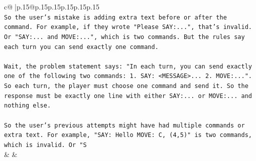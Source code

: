 \documentclass{article}
\begin{document}
{\begin{supertabular}{c@{$\;$}|p{.15\linewidth}@{}p{.15\linewidth}p{.15\linewidth}p{.15\linewidth}p{.15\linewidth}p{.15\linewidth}}
{{{\\ 
\texttt{So the user's mistake is adding extra text before or after the command. For example, if they wrote "Please SAY:...", that's invalid. Or "SAY:... and MOVE:...", which is two commands. But the rules say each turn you can send exactly one command.} \\
\\ 
\texttt{Wait, the problem statement says: "In each turn, you can send exactly one of the following two commands: 1. SAY: <MESSAGE>... 2. MOVE:...". So each turn, the player must choose one command and send it. So the response must be exactly one line with either SAY:... or MOVE:... and nothing else.} \\
\\ 
\texttt{So the user's previous attempts might have had multiple commands or extra text. For example, "SAY: Hello MOVE: C, (4,5)" is two commands, which is invalid. Or "S} \\
            }
        }
    }
    & & \\ \\


\end{supertabular}}
\end{document}
